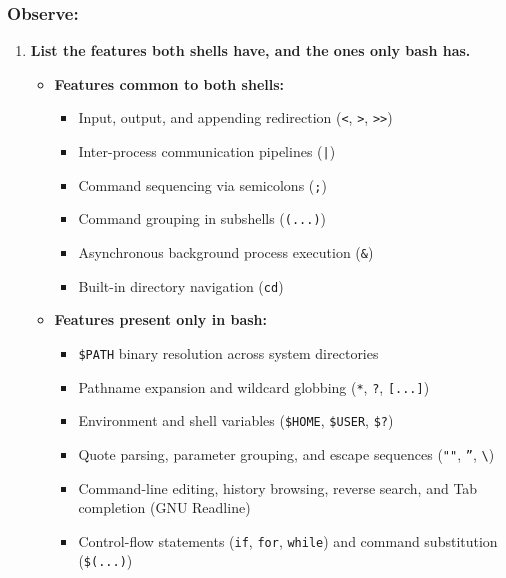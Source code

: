 \documentclass{labreport}
\begin{document}
\subsubsection*{Observe:}
\begin{enumerate}[leftmargin=*]
    \item \textbf{List the features both shells have, and the ones only bash has.}
    \begin{itemize}[noitemsep, topsep=2pt]
        \item \textbf{Features common to both shells:}
        \begin{itemize}[noitemsep]
            \item Input, output, and appending redirection (\texttt{<}, \texttt{>}, \texttt{>>})
            \item Inter-process communication pipelines (\texttt{|})
            \item Command sequencing via semicolons (\texttt{;})
            \item Command grouping in subshells (\texttt{(...)})
            \item Asynchronous background process execution (\texttt{\&})
            \item Built-in directory navigation (\texttt{cd})
        \end{itemize}
        \item \textbf{Features present only in bash:}
        \begin{itemize}[noitemsep]
            \item \texttt{\$PATH} binary resolution across system directories
            \item Pathname expansion and wildcard globbing (\texttt{*}, \texttt{?}, \texttt{[...]})
            \item Environment and shell variables (\texttt{\$HOME}, \texttt{\$USER}, \texttt{\$?})
            \item Quote parsing, parameter grouping, and escape sequences (\texttt{""}, \texttt{''}, \texttt{\textbackslash})
            \item Command-line editing, history browsing, reverse search, and Tab completion (GNU Readline)
            \item Control-flow statements (\texttt{if}, \texttt{for}, \texttt{while}) and command substitution (\texttt{\$(...)})
        \end{itemize}
    \end{itemize}


\end{enumerate}
\end{document}
